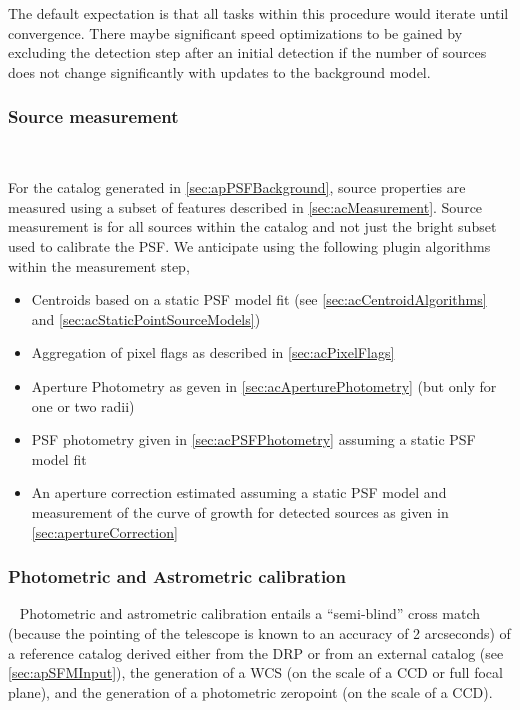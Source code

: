 The default expectation is that all tasks within this procedure would iterate until convergence.  There maybe significant speed optimizations to be gained by excluding the \Source detection step after an initial detection if the number of sources does not change significantly with updates to the background model.

\subsubsection{Source measurement}~
\label{sec:apSourcemeasurement}

For the \Source catalog generated in \ref{sec:apPSFBackground}, source properties are measured using a subset of features described in \ref{sec:acMeasurement}. Source measurement is for all sources within the \Source catalog and not just the bright subset used to calibrate the PSF.  We anticipate using the following plugin algorithms within the \Source measurement step,
\begin{itemize}
\item Centroids based on a static PSF model fit (see \ref{sec:acCentroidAlgorithms} and \ref{sec:acStaticPointSourceModels})
\item Aggregation of pixel flags as described in \ref{sec:acPixelFlags}
\item Aperture Photometry as geven in \ref{sec:acAperturePhotometry} (but only for one or two radii) 
\item PSF photometry given in \ref{sec:acPSFPhotometry} assuming a static PSF model fit
\item  An aperture correction estimated assuming a static PSF model and measurement of the curve of growth for  detected sources as given in \ref{sec:apertureCorrection}
\end{itemize}

\subsubsection{Photometric and Astrometric calibration}~ 
Photometric and astrometric calibration entails a ``semi-blind'' cross match (because the pointing of the telescope is known to an accuracy of 2 arcseconds) of a reference catalog derived either from the DRP \Objects or from an external catalog (see \ref{sec:apSFMInput}), the generation of a WCS (on the scale of a CCD or full focal plane), and the generation of a photometric zeropoint (on the scale of a CCD).

